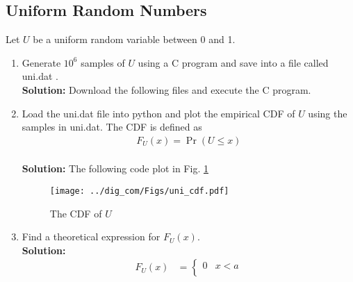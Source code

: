 \documentclass{article}
\numberwithin{equation}{subsection}
\numberwithin{figure}{subsection}
\providecommand{\pr}[1]{\ensuremath{\Pr\left(#1\right)}}
\newcommand{\solution}{\noindent \textbf{Solution: }}
\renewcommand\thesection{\arabic{section}}
\renewcommand\thesubsection{\thesection.\arabic{subsection}}
\begin{document}
\subsection{Uniform Random Numbers}
Let $U$ be a uniform random variable between 0 and 1.
\begin{enumerate}[label=\thesubsection.\arabic*,ref=\thesubsection.\arabic{figure}]%
\item Generate $10^6$ samples of $U$ using a C program and save into a file called uni.dat .
\\
\solution Download the following files and execute the  C program.
\begin{center}
\end{center}\begin{center}
\end{center}
\item
Load the uni.dat file into python and plot the empirical CDF of $U$ using the samples in uni.dat. The CDF is defined as
\begin{align}
F_{U}(x) = \pr{U \le x}
\end{align}
\\
\solution  The following code plot in Fig. \ref{fig:uni_cdf}
\begin{center}
\begin{center}
\end{center}
\end{center}
\begin{figure}
\centering
\texttt{[image: ../dig\_com/Figs/uni\_cdf.pdf]} 
\caption{The CDF of $U$}
\label{fig:uni_cdf}
\end{figure}
\item
Find a  theoretical expression for $F_{U}(x)$.
\\
\solution 
\begin{align}
F_{U}(x) &= 
\begin{cases}
0 & x < a \\

\end{cases}
\end{align}
\end{enumerate}
\end{document}

